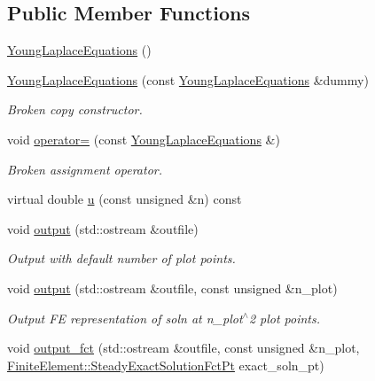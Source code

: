 \subsection*{Public Member Functions}
\begin{DoxyCompactItemize}
\item 
\hyperlink{classoomph_1_1YoungLaplaceEquations_a9f5e39e8fc4bc59789193c23247e67bd}{Young\+Laplace\+Equations} ()
\item 
\hyperlink{classoomph_1_1YoungLaplaceEquations_a5002b4fe54384d6a393c8af4b8dc8a4c}{Young\+Laplace\+Equations} (const \hyperlink{classoomph_1_1YoungLaplaceEquations}{Young\+Laplace\+Equations} \&dummy)
\begin{DoxyCompactList}\small\item\em Broken copy constructor. \end{DoxyCompactList}\item 
void \hyperlink{classoomph_1_1YoungLaplaceEquations_abcf80ec6ad8e642144b648271e096330}{operator=} (const \hyperlink{classoomph_1_1YoungLaplaceEquations}{Young\+Laplace\+Equations} \&)
\begin{DoxyCompactList}\small\item\em Broken assignment operator. \end{DoxyCompactList}\item 
virtual double \hyperlink{classoomph_1_1YoungLaplaceEquations_aa3727069bb00e0b2f37d5bc3bb3b16ae}{u} (const unsigned \&n) const
\item 
void \hyperlink{classoomph_1_1YoungLaplaceEquations_a91fb5787aae4e4f5ed2d777f759170f3}{output} (std\+::ostream \&outfile)
\begin{DoxyCompactList}\small\item\em Output with default number of plot points. \end{DoxyCompactList}\item 
void \hyperlink{classoomph_1_1YoungLaplaceEquations_a52b2a5e3e3292836861d612894b20a41}{output} (std\+::ostream \&outfile, const unsigned \&n\+\_\+plot)
\begin{DoxyCompactList}\small\item\em Output FE representation of soln at n\+\_\+plot$^\wedge$2 plot points. \end{DoxyCompactList}\item 
void \hyperlink{classoomph_1_1YoungLaplaceEquations_a7938b426803efb21be5d7b7e78be16c5}{output\+\_\+fct} (std\+::ostream \&outfile, const unsigned \&n\+\_\+plot, \hyperlink{classoomph_1_1FiniteElement_a690fd33af26cc3e84f39bba6d5a85202}{Finite\+Element\+::\+Steady\+Exact\+Solution\+Fct\+Pt} exact\+\_\+soln\+\_\+pt)

\end{DoxyCompactItemize}

